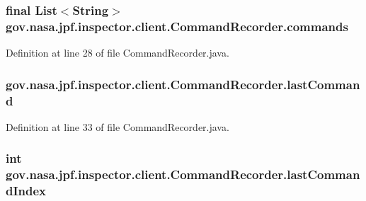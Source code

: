 \subsubsection[{\texorpdfstring{commands}{commands}}]{\setlength{\rightskip}{0pt plus 5cm}final List$<$String$>$ gov.\+nasa.\+jpf.\+inspector.\+client.\+Command\+Recorder.\+commands\hspace{0.3cm}{\ttfamily [private]}}\hypertarget{classgov_1_1nasa_1_1jpf_1_1inspector_1_1client_1_1_command_recorder_a7ad7a5310decec4f7bbcde5b52d4aaf8}{}\label{classgov_1_1nasa_1_1jpf_1_1inspector_1_1client_1_1_command_recorder_a7ad7a5310decec4f7bbcde5b52d4aaf8}


Definition at line 28 of file Command\+Recorder.\+java.

\subsubsection[{\texorpdfstring{last\+Command}{lastCommand}}]{ gov.\+nasa.\+jpf.\+inspector.\+client.\+Command\+Recorder.\+last\+Command\hspace{0.3cm}{\ttfamily [private]}}\hypertarget{classgov_1_1nasa_1_1jpf_1_1inspector_1_1client_1_1_command_recorder_ac05b41431d0bb937eb7a12adae083dff}{}\label{classgov_1_1nasa_1_1jpf_1_1inspector_1_1client_1_1_command_recorder_ac05b41431d0bb937eb7a12adae083dff}


Definition at line 33 of file Command\+Recorder.\+java.

\subsubsection[{\texorpdfstring{last\+Command\+Index}{lastCommandIndex}}]{\setlength{\rightskip}{0pt plus 5cm}int gov.\+nasa.\+jpf.\+inspector.\+client.\+Command\+Recorder.\+last\+Command\+Index\hspace{0.3cm}{\ttfamily [private]}}\hypertarget{classgov_1_1nasa_1_1jpf_1_1inspector_1_1client_1_1_command_recorder_a842c677a69d9b386e86c08985b1ba1f9}{}\label{classgov_1_1nasa_1_1jpf_1_1inspector_1_1client_1_1_command_recorder_a842c677a69d9b386e86c08985b1ba1f9}


